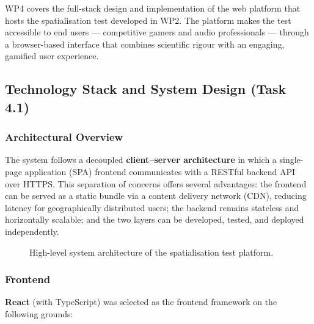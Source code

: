 WP4 covers the full-stack design and implementation of the web platform that hosts the
spatialisation test developed in WP2. The platform makes the test accessible to end users
— competitive gamers and audio professionals — through a browser-based interface that
combines scientific rigour with an engaging, gamified user experience.

\subsection{Technology Stack and System Design (Task 4.1)}

\subsubsection{Architectural Overview}

The system follows a decoupled \textbf{client–server architecture} in which a single-page
application (SPA) frontend communicates with a RESTful backend API over HTTPS. This
separation of concerns offers several advantages: the frontend can be served as a static
bundle via a content delivery network (CDN), reducing latency for geographically distributed
users; the backend remains stateless and horizontally scalable; and the two layers can be
developed, tested, and deployed independently.

\begin{figure}[h]
    \centering
    \caption{High-level system architecture of the spatialisation test platform.}
    \label{fig:architecture}
\end{figure}

\subsubsection{Frontend}

\textbf{React} (with TypeScript) was selected as the frontend framework on the following grounds:

